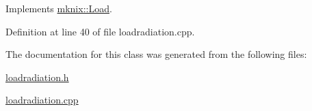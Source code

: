 Implements \hyperlink{classmknix_1_1_load_ada30463dd508345b27de70e3c470745c}{mknix\+::\+Load}.



Definition at line 40 of file loadradiation.\+cpp.



The documentation for this class was generated from the following files\+:\begin{DoxyCompactItemize}
\item 
\hyperlink{loadradiation_8h}{loadradiation.\+h}\item 
\hyperlink{loadradiation_8cpp}{loadradiation.\+cpp}\end{DoxyCompactItemize}
